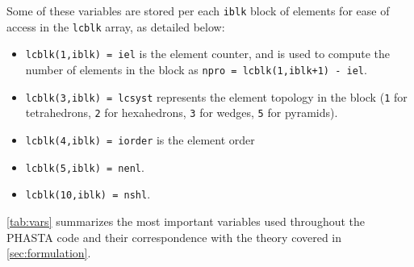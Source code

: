 \documentclass{ucb}
\begin{document}
Some of these variables are stored per each \texttt{iblk} block of elements for ease of access in the \texttt{lcblk} array, as detailed below:
\begin{itemize}
    \item \texttt{lcblk(1,iblk) = iel} is the element counter, and is used to compute the number of elements in the block as \texttt{npro = lcblk(1,iblk+1) - iel}.
    \item \texttt{lcblk(3,iblk) = lcsyst} represents the element topology in the block (\texttt{1} for tetrahedrons, \texttt{2} for hexahedrons, \texttt{3} for wedges, \texttt{5} for pyramids).
    \item \texttt{lcblk(4,iblk) = iorder} is the element order
    \item \texttt{lcblk(5,iblk) = nenl}.
    \item \texttt{lcblk(10,iblk) = nshl}.
\end{itemize}

\autoref{tab:vars} summarizes the most important variables used throughout the PHASTA code and their correspondence with the theory covered in \autoref{sec:formulation}.

\pagebreak
\end{document}
